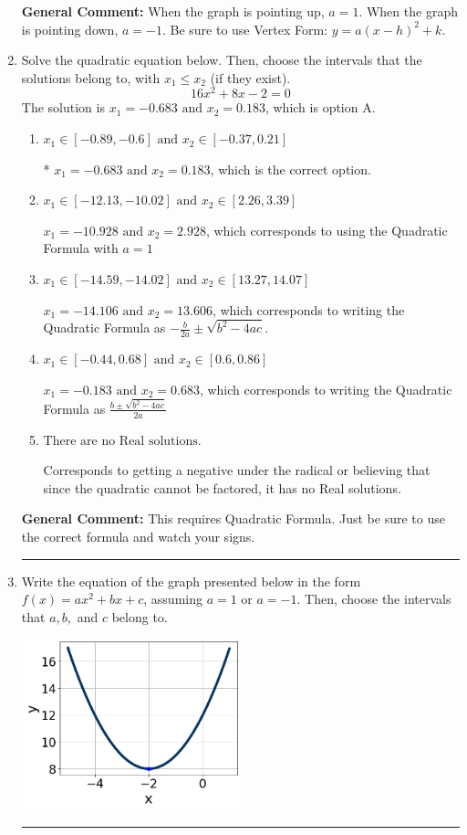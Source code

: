 \documentclass{extbook}[14pt]
\newcommand{\litem}[1]{\item #1

\rule{\textwidth}{0.4pt}}
\begin{document}
\begin{enumerate}
{\textbf{General Comment:} When the graph is pointing up, $a=1$. When the graph is pointing down, $a=-1$. Be sure to use Vertex Form: $y = a(x-h)^2+k$.
}
\litem{
Solve the quadratic equation below. Then, choose the intervals that the solutions belong to, with $x_1 \leq x_2$ (if they exist).
\[ 16x^{2} +8 x -2 = 0 \]The solution is \( x_1 = -0.683 \text{ and } x_2 = 0.183 \), which is option A.\begin{enumerate}[label=\Alph*.]
\item \( x_1 \in [-0.89, -0.6] \text{ and } x_2 \in [-0.37, 0.21] \)

* $x_1 = -0.683 \text{ and } x_2 = 0.183$, which is the correct option.
\item \( x_1 \in [-12.13, -10.02] \text{ and } x_2 \in [2.26, 3.39] \)

 $x_1 = -10.928 \text{ and } x_2 = 2.928$, which corresponds to using the Quadratic Formula with $a=1$
\item \( x_1 \in [-14.59, -14.02] \text{ and } x_2 \in [13.27, 14.07] \)

 $x_1 = -14.106 \text{ and } x_2 = 13.606$, which corresponds to writing the Quadratic Formula as $-\frac{b}{2a} \pm \sqrt{b^2 - 4ac}$.
\item \( x_1 \in [-0.44, 0.68] \text{ and } x_2 \in [0.6, 0.86] \)

 $x_1 = -0.183 \text{ and } x_2 = 0.683$, which corresponds to writing the Quadratic Formula as $\frac{b \pm \sqrt{b^2 - 4ac}}{2a}$
\item \( \text{There are no Real solutions.} \)

Corresponds to getting a negative under the radical or believing that since the quadratic cannot be factored, it has no Real solutions.
\end{enumerate}

\textbf{General Comment:} This requires Quadratic Formula. Just be sure to use the correct formula and watch your signs.
}
\litem{
Write the equation of the graph presented below in the form $f(x)=ax^2+bx+c$, assuming  $a=1$ or $a=-1$. Then, choose the intervals that $a, b,$ and $c$ belong to.

\begin{center}
    \includegraphics[width=0.5\textwidth]{../Figures/quadraticGraphToEquationC.png}
\end{center}


}
\end{enumerate}
\end{document}

